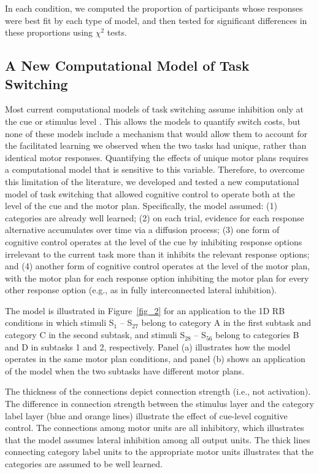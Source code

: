 \documentclass[doc, floatsintext]{apa7}
\begin{document}
In each condition, we computed the proportion of
participants whose responses were best fit by each type of
model, and then tested for significant differences in these
proportions using $\chi^2$ tests.

\subsection{A New Computational Model of Task Switching}
Most current computational models of task switching assume
inhibition only at the cue or stimulus level
\parencite{botvinick_conflict_2001,
blais_item-specific_2007, verguts_hebbian_2008,
abrahamse_grounding_2016}. This allows the models to
quantify switch costs, but none of these models include a
mechanism that would allow them to account for the
facilitated learning we observed when the two tasks had
unique, rather than identical motor responses. Quantifying
the effects of unique motor plans requires a computational
model that is sensitive to this variable. Therefore, to
overcome this limitation of the literature, we developed and
tested a new computational model of task switching that
allowed cognitive control to operate both at the level of
the cue and the motor plan. Specifically, the model assumed:
(1) categories are already well learned; (2) on each trial,
evidence for each response alternative accumulates over time
via a diffusion process; (3) one form of cognitive control
operates at the level of the cue by inhibiting response
options irrelevant to the current task more than it inhibits
the relevant response options; and (4) another form of
cognitive control operates at the level of the motor plan,
with the motor plan for each response option inhibiting the
motor plan for every other response option (e.g., as in
fully interconnected lateral inhibition).

The model is illustrated in Figure~\ref{fig_2} for an
application to the 1D RB conditions in which stimuli S$_1$
-- S$_{27}$ belong to category A in the first subtask and
category C in the second subtask, and stimuli S$_{28}$ --
S$_{56}$ belong to categories B and D in subtasks 1 and 2,
respectively. Panel (a) illustrates how the model operates
in the same motor plan conditions, and panel (b) shows an
application of the model when the two subtasks have
different motor plans. 

The thickness of the connections depict connection strength
(i.e., not activation). The difference in connection
strength between the stimulus layer and the category label
layer (blue and orange lines) illustrate the effect of
cue-level cognitive control. The connections among motor
units are all inhibitory, which illustrates that the model
assumes lateral inhibition among all output units. The thick
lines connecting category label units to the appropriate
motor units illustrates that the categories are assumed to
be well learned.
\end{document}

